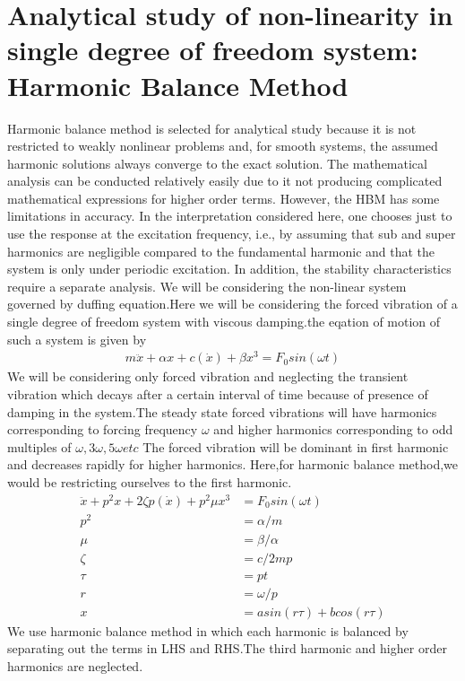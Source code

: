 \chapter{Analytical study of non-linearity in single degree of freedom system:\\Harmonic Balance Method}
Harmonic balance method is selected for analytical study because it is not restricted to weakly nonlinear problems and, for smooth systems, the assumed harmonic solutions always converge to the exact solution. The mathematical analysis can be conducted relatively easily due to it not producing complicated mathematical expressions for higher order terms. However, the HBM has some limitations in accuracy. In the interpretation considered here, one chooses just to use the response at the excitation frequency, i.e., by assuming that sub and super harmonics are negligible compared to the fundamental harmonic and that the system is only under periodic excitation. In addition, the stability characteristics require a separate analysis. 
We will be considering the non-linear system governed by duffing equation.Here we will be considering the forced vibration of a single degree of freedom system with viscous damping.the eqation of motion of such a system is given by
\begin{align}
m\ddot{x}+\alpha x+c(\dot{x})+\beta x^3=F_0sin(\omega t)
\end{align}
We will be considering only forced vibration and neglecting the transient vibration which decays after a certain interval of time because of presence of damping in the system.The steady state forced vibrations will have harmonics corresponding to forcing frequency $\omega$ and higher harmonics corresponding to odd multiples of $\omega ,3\omega , 5\omega etc$ The forced vibration will be dominant in first harmonic and decreases rapidly for higher harmonics.
Here,for harmonic balance method,we would be restricting ourselves to the first harmonic.
\begin{align}
\ddot{x}+p^2 x+2 \zeta p (\dot{x})+p^2 \mu x^3 &=F_0sin(\omega t)\\
p^2 &= \alpha /m \\
\mu & = \beta / \alpha \\
\zeta &=c/2mp \\
\tau &= pt \\
r &= \omega /p \\
x &= asin(r\tau )+bcos(r\tau)
\end{align}
We use harmonic balance method in which each harmonic is balanced by separating out the terms in LHS and RHS.The third harmonic and higher order harmonics are neglected.
